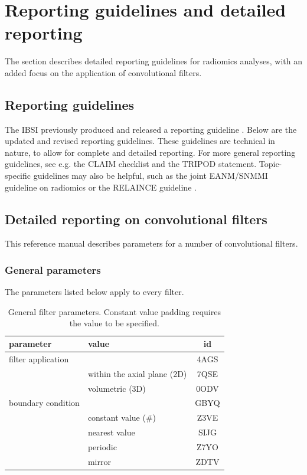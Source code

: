 \documentclass[fleqn,a4paper,oneside,openany]{book}
\newcommand\textid[1]{{\normalsize{\idfont #1}}}
\begin{document}
\chapter{Reporting guidelines and detailed reporting}\label{sec:guidelinesDetails}

The section describes detailed reporting guidelines for radiomics analyses, with an added focus on the application of convolutional filters.

\section{Reporting guidelines}\label{sec_reporting_guidelines}

The IBSI previously produced and released a reporting guideline \cite{Zwanenburg2020-jt}. Below are the updated and revised reporting guidelines. These guidelines are technical in nature, to allow for complete and detailed reporting. For more general reporting guidelines, see e.g. the CLAIM \cite{Mongan2020-rn} checklist and the TRIPOD \cite{Collins2015-lx} statement. Topic-specific guidelines may also be helpful, such as the joint EANM/SNMMI guideline on radiomics \cite{Hatt2022-uo} or the RELAINCE guideline \cite{Jha2022-jw}.



\section{Detailed reporting on convolutional filters}
This reference manual describes parameters for a number of convolutional filters.

\subsection{General parameters}
The parameters listed below apply to every filter.

\begin{table}[ht]
\centering
\small
\begin{tabular}{llc}
\toprule
\textbf{parameter} & \textbf{value} & \textbf{id}\\
\midrule
filter application & & \textid{4AGS}\\
& within the axial plane (2D) & \textid{7QSE}\\
& volumetric (3D) & \textid{0ODV}\\
boundary condition & & \textid{GBYQ}\\
& constant value (\#) & \textid{Z3VE}\\
& nearest value & \textid{SIJG}\\
& periodic & \textid{Z7YO}\\
& mirror & \textid{ZDTV}\\
\bottomrule
\end{tabular}
\caption{General filter parameters. Constant value padding requires the value to be specified.}
\end{table}
\end{document}
